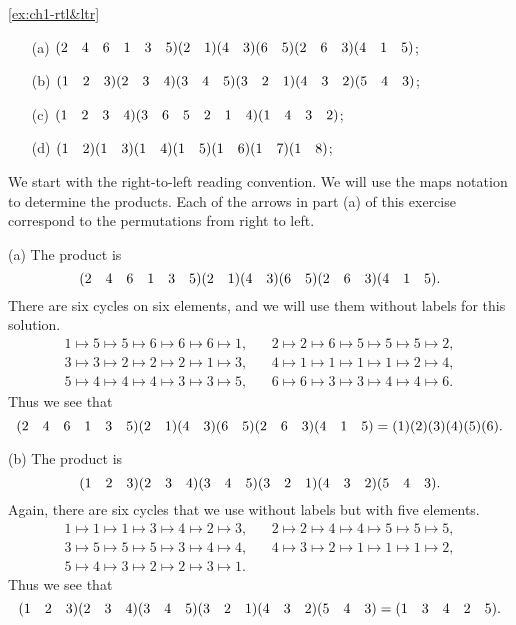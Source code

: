 \begin{solution}{\ref{ex:ch1-rtl&ltr}}{\begin{itemize}[nolistsep]
        \item[(a)] \q$(2 \quad 4 \quad 6 \quad 1 \quad 3 \quad 5)(2 \quad 1)(4 \quad 3)(6 \quad 5)(2 \quad 6 \quad 3)(4 \quad 1 \quad 5)$;
        \item[(b)] \q$(1 \quad 2 \quad 3)(2 \quad 3 \quad 4)(3 \quad 4 \quad 5)(3 \quad 2 \quad 1)(4 \quad 3 \quad 2)(5 \quad 4 \quad 3)$;
        \item[(c)] \q$(1 \quad 2 \quad 3 \quad 4)(3 \quad 6 \quad 5 \quad 2 \quad 1 \quad 4)(1 \quad 4 \quad 3 \quad 2)$;
        \item[(d)] \q$(1 \quad 2)(1 \quad 3)(1 \quad 4)(1 \quad 5)(1 \quad 6)(1 \quad 7)(1 \quad 8)$;
    \end{itemize}
    We start with the right-to-left reading convention. We will use the maps notation to determine the products. Each of the arrows in part (a) of this exercise correspond to the permutations from right to left.

    (a) The product is
    \[
    (2 \quad 4 \quad 6 \quad 1 \quad 3 \quad 5)(2 \quad 1)(4 \quad 3)(6 \quad 5)(2 \quad 6 \quad 3)(4 \quad 1 \quad 5).
    \]
    There are six cycles on six elements, and we will use them without labels for this solution.
    \[
    \begin{array}{c}
        1 \mapsto 5 \mapsto 5 \mapsto 6 \mapsto 6 \mapsto 6 \mapsto 1, \hspace{20pt} 2 \mapsto 2 \mapsto 6 \mapsto 5 \mapsto 5 \mapsto 5 \mapsto 2,\\
        3 \mapsto 3 \mapsto 2 \mapsto 2 \mapsto 2 \mapsto 1 \mapsto 3, \hspace{20pt} 4 \mapsto 1 \mapsto 1 \mapsto 1 \mapsto 1 \mapsto 2 \mapsto 4,\\
        5 \mapsto 4 \mapsto 4 \mapsto 4 \mapsto 3 \mapsto 3 \mapsto 5, \hspace{20pt} 6 \mapsto 6 \mapsto 3 \mapsto 3 \mapsto 4 \mapsto 4 \mapsto 6.
    \end{array}
    \]
    Thus we see that
    \[
    (2 \quad 4 \quad 6 \quad 1 \quad 3 \quad 5)(2 \quad 1)(4 \quad 3)(6 \quad 5)(2 \quad 6 \quad 3)(4 \quad 1 \quad 5) = (1)(2)(3)(4)(5)(6).
    \]

    (b) The product is
    \[
    (1 \quad 2 \quad 3)(2 \quad 3 \quad 4)(3 \quad 4 \quad 5)(3 \quad 2 \quad 1)(4 \quad 3 \quad 2)(5 \quad 4 \quad 3).
    \]
    Again, there are six cycles that we use without labels but with five elements.
    \[
    \begin{array}{c}
        1 \mapsto 1 \mapsto 1 \mapsto 3 \mapsto 4 \mapsto 2 \mapsto 3, \hspace{20pt} 2 \mapsto 2 \mapsto 4 \mapsto 4 \mapsto 5 \mapsto 5 \mapsto 5,\\
        3 \mapsto 5 \mapsto 5 \mapsto 5 \mapsto 3 \mapsto 4 \mapsto 4, \hspace{20pt} 4 \mapsto 3 \mapsto 2 \mapsto 1 \mapsto 1 \mapsto 1 \mapsto 2,\\
        5 \mapsto 4 \mapsto 3 \mapsto 2 \mapsto 2 \mapsto 3 \mapsto 1.
    \end{array}
    \]
    Thus we see that
    \[
    (1 \quad 2 \quad 3)(2 \quad 3 \quad 4)(3 \quad 4 \quad 5)(3 \quad 2 \quad 1)(4 \quad 3 \quad 2)(5 \quad 4 \quad 3) = (1 \quad 3 \quad 4 \quad 2 \quad 5).
    \]

}
\end{solution}
